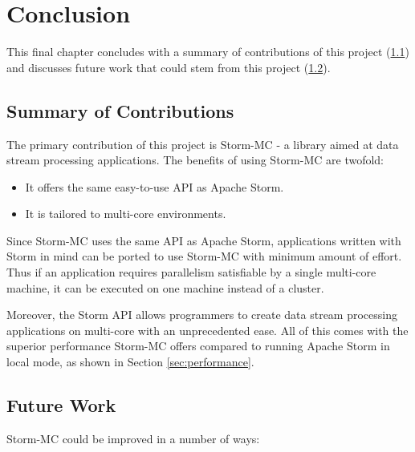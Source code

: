 \chapter{Conclusion}

This final chapter concludes with a summary of contributions of this project (\ref{sec:contribs}) and discusses future work that could stem from this project (\ref{sec:future_work}).

\section{Summary of Contributions}
\label{sec:contribs}

The primary contribution of this project is Storm-MC - a library aimed at data stream processing applications. The benefits of using Storm-MC are twofold:

\begin{itemize}
	\item It offers the same easy-to-use API as Apache Storm.
	\item It is tailored to multi-core environments.
\end{itemize}

Since Storm-MC uses the same API as Apache Storm, applications written with Storm in mind can be ported to use Storm-MC with minimum amount of effort. Thus if an application requires parallelism satisfiable by a single multi-core machine, it can be executed on one machine instead of a cluster.

Moreover, the Storm API allows programmers to create data stream processing applications on multi-core with an unprecedented ease. All of this comes with the superior performance Storm-MC offers compared to running Apache Storm in local mode, as shown in Section \ref{sec:performance}.

\section{Future Work}
\label{sec:future_work}

Storm-MC could be improved in a number of ways:

